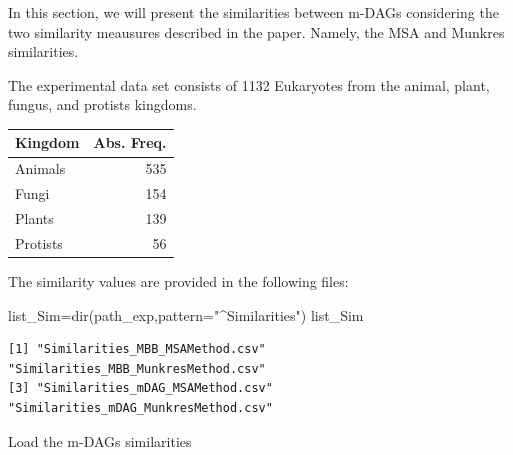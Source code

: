 \documentclass[
  letterpaper,
  DIV=11,
  numbers=noendperiod]{scrreprt}
\newenvironment{Shaded}{}{}
\newcommand{\AttributeTok}[1]{\textcolor[rgb]{0.78,0.47,0.87}{#1}}
\newcommand{\DecValTok}[1]{\textcolor[rgb]{0.82,0.60,0.40}{#1}}
\newcommand{\FunctionTok}[1]{\textcolor[rgb]{0.38,0.69,0.94}{#1}}
\newcommand{\NormalTok}[1]{\textcolor[rgb]{0.67,0.70,0.75}{#1}}
\newcommand{\OtherTok}[1]{\textcolor[rgb]{0.15,0.68,0.38}{#1}}
\newcommand{\SpecialCharTok}[1]{\textcolor[rgb]{0.34,0.71,0.76}{#1}}
\newcommand{\StringTok}[1]{\textcolor[rgb]{0.60,0.76,0.47}{#1}}
\begin{document}
In this section, we will present the similarities between m-DAGs
considering the two similarity meausures described in the paper. Namely,
the MSA and Munkres similarities.

The experimental data set consists of 1132 Eukaryotes from the animal,
plant, fungus, and protists kingdoms.

\begin{tabular}{l|r}
\hline
Kingdom & Abs. Freq.\\
\hline
Animals & 535\\
\hline
Fungi & 154\\
\hline
Plants & 139\\
\hline
Protists & 56\\
\hline
\end{tabular}

The similarity values are provided in the following files:

\begin{Shaded}
\begin{Highlighting}[]
\NormalTok{list\_Sim}\OtherTok{=}\FunctionTok{dir}\NormalTok{(path\_exp,}\AttributeTok{pattern=}\StringTok{"\^{}Similarities"}\NormalTok{)}
\NormalTok{list\_Sim}
\end{Highlighting}
\end{Shaded}

\begin{verbatim}
[1] "Similarities_MBB_MSAMethod.csv"      "Similarities_MBB_MunkresMethod.csv" 
[3] "Similarities_mDAG_MSAMethod.csv"     "Similarities_mDAG_MunkresMethod.csv"
\end{verbatim}

Load the m-DAGs similarities

\begin{Shaded}
\end{Shaded}
\end{document}

